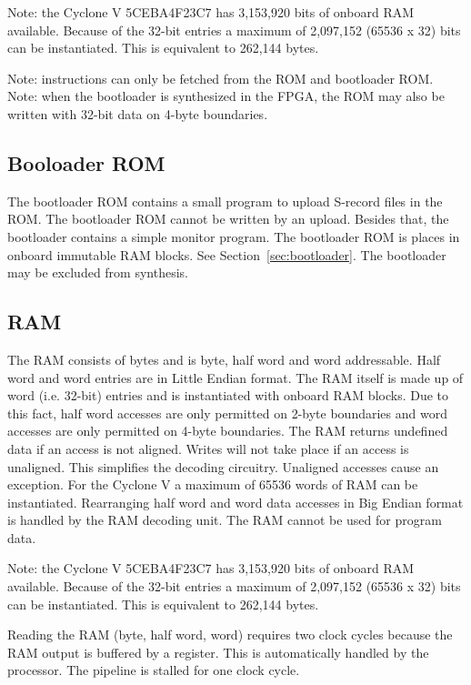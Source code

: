 \documentclass[12pt]{article}
\begin{document}
Note: the Cyclone V 5CEBA4F23C7 has 3,153,920 bits of onboard RAM available. Because of the 32-bit entries a maximum of 2,097,152 (65536 x 32) bits can be instantiated. This is equivalent to 262,144 bytes.

Note: instructions can only be fetched from the ROM and bootloader ROM. Note: when the bootloader is synthesized in the FPGA, the ROM may also be written with 32-bit data on 4-byte boundaries.

\subsection{Booloader ROM}
\label{sec:bootloaderrom}
The bootloader ROM contains a small program to upload S-record files in the ROM. The bootloader ROM cannot be written by an upload. Besides that, the bootloader contains a simple monitor program. The bootloader ROM is places in onboard immutable RAM blocks. See Section~\ref{sec:bootloader}. The bootloader may be excluded from synthesis.

\subsection{RAM}
\label{sec:ram}
The RAM consists of bytes and is byte, half word and word addressable. Half word and word entries are in Little Endian format. The RAM itself is made up of word (i.e. 32-bit) entries and is instantiated with onboard RAM blocks. Due to this fact, half word accesses are only permitted on 2-byte boundaries and word accesses are only permitted on 4-byte boundaries. The RAM returns undefined data if an access is not aligned. Writes will not take place if an access is unaligned. This simplifies the decoding circuitry. Unaligned accesses cause an exception. For the Cyclone V a maximum of 65536 words of RAM can be instantiated. Rearranging half word and word data accesses in Big Endian format is handled by the RAM decoding unit. The RAM cannot be used for program data.

Note: the Cyclone V 5CEBA4F23C7 has 3,153,920 bits of onboard RAM available. Because of the 32-bit entries a maximum of 2,097,152 (65536 x 32) bits can be instantiated. This is equivalent to 262,144 bytes.

Reading the RAM (byte, half word, word) requires two clock cycles because the RAM output is buffered by a register. This is automatically handled by the processor. The pipeline is stalled for one clock cycle.
\end{document}
